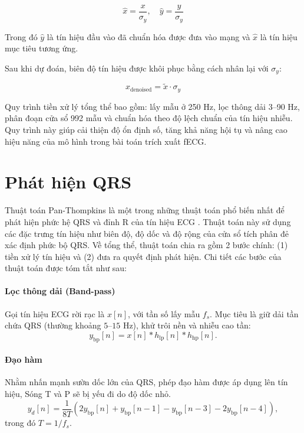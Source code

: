 \begin{equation}
  \hat{x} = \frac{x}{\sigma_y}, \quad
  \hat{y} = \frac{y}{\sigma_y}
\end{equation}

Trong đó $\hat{y}$ là tín hiệu đầu vào đã chuẩn hóa được đưa vào mạng và $\hat{x}$ là tín hiệu mục tiêu tương ứng.

Sau khi dự đoán, biên độ tín hiệu được khôi phục bằng cách nhân lại với $\sigma_y$:

\begin{equation}
  x_{\text{denoised}} = \tilde{x} \cdot \sigma_y
\end{equation}

Quy trình tiền xử lý tổng thể bao gồm: lấy mẫu ở 250 Hz, lọc thông dải 3--90 Hz, phân đoạn cửa sổ 992 mẫu và chuẩn hóa theo độ lệch chuẩn của tín hiệu nhiễu. Quy trình này giúp cải thiện độ ổn định số, tăng khả năng hội tụ và nâng cao hiệu năng của mô hình trong bài toán trích xuất fECG.

\section{Phát hiện QRS}

Thuật toán Pan-Thompkins là một trong những thuật toán phổ biến nhất để phát hiện phức hệ QRS và đỉnh R của tín hiệu ECG \cite{panRealTimeQRSDetection1985a}. Thuật toán này sử dụng các đặc trưng tín hiệu như biên độ, độ dốc và độ rộng của cửa sổ tích phân đẻ xác định phức bộ QRS. Về tổng thể, thuật toán chia ra gồm 2 bước chính: (1) tiền xử lý tín hiệu và (2) đưa ra quyết định phát hiện. Chi tiết các bước của thuật toán được tóm tắt như sau:

\paragraph{Lọc thông dải (Band-pass)}

Gọi tín hiệu ECG rời rạc là $x[n]$, với tần số lấy mẫu $f_s$.
Mục tiêu là giữ dải tần chứa QRS (thường khoảng $5$--$15$ Hz), khử trôi nền và nhiễu cao tần:
\begin{equation}
  y_{\mathrm{bp}}[n] = x[n] * h_{\mathrm{lp}}[n] * h_{\mathrm{hp}}[n].
\end{equation}

\paragraph{Đạo hàm}

Nhằm nhấn mạnh sườn dốc lớn của QRS, phép đạo hàm được áp dụng lên tín hiệu, Sóng T và P sẽ bị yếu đi do độ dốc nhỏ.
\begin{equation}
  y_d[n] = \frac{1}{8T}\left(2y_{\mathrm{bp}}[n] + y_{\mathrm{bp}}[n-1] - y_{\mathrm{bp}}[n-3] - 2y_{\mathrm{bp}}[n-4]\right),
\end{equation}
trong đó $T=1/f_s$.

